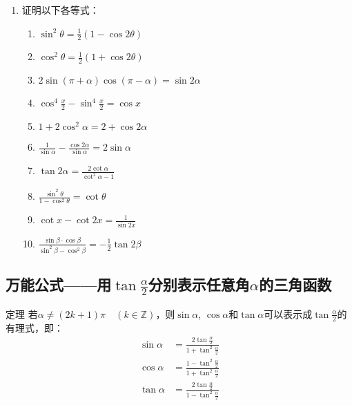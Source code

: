 \begin{ex}
\begin{enumerate}
\item 证明以下各等式：
\begin{enumerate}
    \item $\sin^2\theta=\frac{1}{2}(1-\cos2\theta)$
    \item $\cos^2\theta=\frac{1}{2}(1+\cos2\theta)$
    \item $2\sin(\pi+\alpha)\cos(\pi-\alpha)=\sin2\alpha$
    \item $\cos^4\frac{x}{2}-\sin^4\frac{x}{2}=\cos x$
    \item $1+2\cos^2\alpha=2+\cos2\alpha$
    \item $\frac{1}{\sin\alpha}-\frac{\cos2\alpha}{\sin\alpha}=2\sin\alpha$
    \item $\tan2\alpha=\frac{2\cot\alpha}{\cot^2\alpha-1}$
    \item $\frac{\sin^2\theta}{1-\cos^2\theta}=\cot\theta$
    \item $\cot x-\cot2x=\frac{1}{\sin 2x}$
    \item $\frac{\sin\beta\cdot \cos\beta}{\sin^2\beta-\cos^2\beta}=-\frac{1}{2}\tan2\beta$
\end{enumerate}
\end{enumerate}    


\end{ex}

\subsection{万能公式——用$\tan\frac{\alpha}{2}$分别表示任意角$\alpha$的三角函数}

\begin{blk}{定理}
若$\alpha\ne (2k+1)\pi\quad (k\in\mathbb{Z})$，则$\sin\alpha$, $\cos\alpha$和$\tan\alpha$可以表示成$\tan\frac{\alpha}{2}$的有理式，即：
\begin{align}
\sin\alpha &=\frac{2\tan\frac{\alpha}{2}}{1+\tan^2\frac{\alpha}{2}}\\
\cos\alpha&=\frac{1-\tan^2\frac{\alpha}{2}}{1+\tan^2\frac{\alpha}{2}}\\
\tan\alpha&=\frac{2\tan\frac{\alpha}{2}}{1-\tan^2\frac{\alpha}{2}}
\end{align}
\end{blk}

